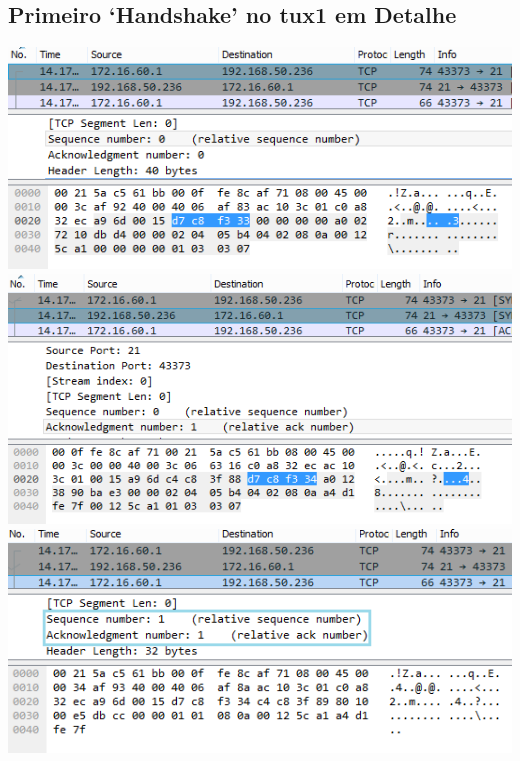 \documentclass[11pt,a4paper,reqno]{report}
\numberwithin{equation}{section}
\begin{document}
\begin{appendices}
\subsection{Primeiro `Handshake' no tux1 em Detalhe}
\label{ex6_tux1_1sthandshake}
\includegraphics[width=18cm]{ex6_handshake1.png}
\includegraphics[width=18cm]{ex6_handshake2.png}
\includegraphics[width=18cm]{ex6_handshake3.png}


\end{appendices}
\end{document}
